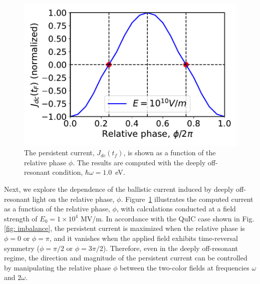 \begin{figure}[htbp]
\centering
\includegraphics[width=0.8\linewidth]{pic/jdc_vs_phi_off_resonance.pdf}
\caption{\label{fig:jdc_vs_phi_off_resonance} 
The persistent current, $J_{dc}(t_f)$, is shown as a function of the relative phase $\phi$. The results are computed with the deeply off-resonant condition, $\hbar\omega = 1.0$~eV.
}
\end{figure}

Next, we explore the dependence of the ballistic current induced by deeply off-resonant light on
the relative phase, $\phi$. Figure~\ref{fig:jdc_vs_phi_off_resonance} illustrates the computed
current as a function of the relative phase, $\phi$, with calculations conducted at a field
strength of $E_0=1 \times 10^{4}$ MV/m. In accordance with the QuIC case shown in Fig.\ref{fig:
imbalance}, the persistent current is maximized when the relative phase is $\phi=0$ or $\phi=\pi$,
and it vanishes when the applied field exhibits time-reversal symmetry ($\phi=\pi/2$ or
$\phi=3\pi/2$). Therefore, even in the deeply off-resonant regime, the direction and magnitude of
the persistent current can be controlled by manipulating the relative phase $\phi$ between the
two-color fields at frequencies $\omega$ and $2\omega$.\\

